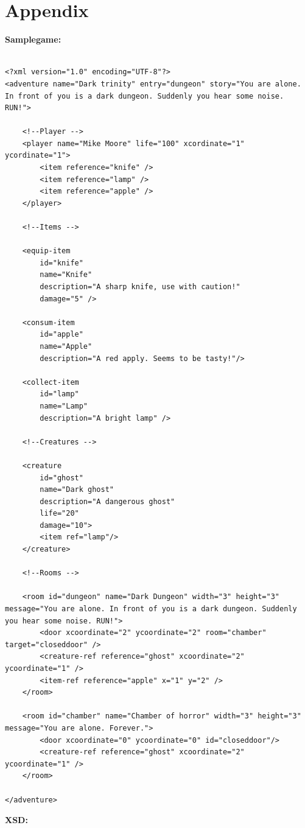 \chapter{Appendix}
\textbf{Samplegame:}
\lstset{language=XML}
\begin{lstlisting}

<?xml version="1.0" encoding="UTF-8"?>
<adventure name="Dark trinity" entry="dungeon" story="You are alone. In front of you is a dark dungeon. Suddenly you hear some noise. RUN!">

    <!--Player -->
    <player name="Mike Moore" life="100" xcordinate="1" ycordinate="1">
        <item reference="knife" />
        <item reference="lamp" />
        <item reference="apple" />
    </player>

    <!--Items -->
    
    <equip-item
        id="knife"
        name="Knife"
        description="A sharp knife, use with caution!"
        damage="5" />

    <consum-item
        id="apple"
        name="Apple"
        description="A red apply. Seems to be tasty!"/>

    <collect-item
        id="lamp"
        name="Lamp"
        description="A bright lamp" />

    <!--Creatures -->

    <creature
        id="ghost"
        name="Dark ghost"
        description="A dangerous ghost"
        life="20"
        damage="10">
        <item ref="lamp"/>
    </creature>
       
    <!--Rooms -->

    <room id="dungeon" name="Dark Dungeon" width="3" height="3" message="You are alone. In front of you is a dark dungeon. Suddenly you hear some noise. RUN!">
        <door xcoordinate="2" ycoordinate="2" room="chamber" target="closeddoor" />
        <creature-ref reference="ghost" xcoordinate="2" ycoordinate="1" />
        <item-ref reference="apple" x="1" y="2" />
    </room>

    <room id="chamber" name="Chamber of horror" width="3" height="3" message="You are alone. Forever.">
        <door xcoordinate="0" ycoordinate="0" id="closeddoor"/>
        <creature-ref reference="ghost" xcoordinate="2" ycoordinate="1" />
    </room>

</adventure>
\end{lstlisting}
\textbf{XSD:}
\lstset{language=XML}
